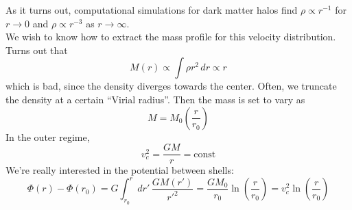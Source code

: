 \documentclass[10pt]{article}
\newcommand{\n}{\noindent}
\begin{document}
	\n As it turns out, computational simulations for dark matter halos find $\rho\propto r^{-1}$ for $r\to 0$ and $\rho\propto r^{-3}$ as $r\to \infty$.\\
	
	\n We wish to know how to extract the mass profile for this velocity distribution. Turns out that
	$$M(r)\propto \int \rho r^2\,dr\propto r$$
	which is bad, since the density diverges towards the center. Often, we truncate the density at a certain ``Virial radius''. Then the mass is set to vary as
	$$M=M_0\left(\frac{r}{r_0}\right)$$
	In the outer regime,
	$$v_c^2=\frac{GM}{r}=\mathrm{const}$$
	We're really interested in the potential between shells:
	\begin{equation}\label{singular1} \Phi(r)-\Phi(r_0)=G\int_{r_0}^{r}dr'\,\frac{GM(r')}{{r'}^2} = \frac{GM_0}{r_0}\ln\left(\frac{r}{r_0}\right)=v_c^2\ln\left(\frac{r}{r_0}\right)\end{equation}
	
	
	
	
	
	
\end{document}
